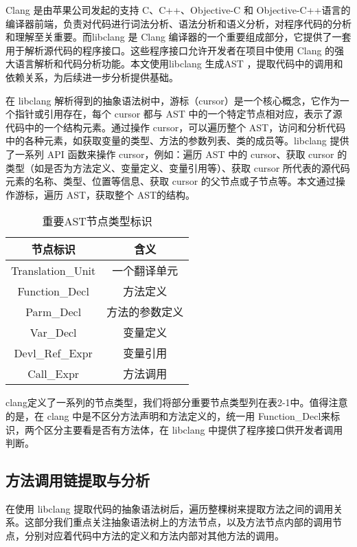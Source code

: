 Clang 是由苹果公司发起的支持 C、C++、Objective-C 和 Objective-C++语言的编译器前端，负责对代码进行词法分析、语法分析和语义分析，对程序代码的分析和理解至关重要\cite{clang}。而libclang 是 Clang 编译器的一个重要组成部分，它提供了一套用于解析源代码的程序接口。这些程序接口允许开发者在项目中使用 Clang 的强大语言解析和代码分析功能\cite{libclang}。本文使用libclang 生成AST ，提取代码中的调用和依赖关系，为后续进一步分析提供基础。

在 libclang 解析得到的抽象语法树中，游标（cursor）是一个核心概念，它作为一个指针或引用存在，每个 cursor 都与 AST 中的一个特定节点相对应，表示了源代码中的一个结构元素。通过操作 cursor，可以遍历整个 AST，访问和分析代码中的各种元素，如获取变量的类型、方法的参数列表、类的成员等。libclang 提供了一系列 API 函数来操作 cursor，例如：遍历 AST 中的 cursor、获取 cursor 的类型（如是否为方法定义、变量定义、变量引用等）、获取 cursor 所代表的源代码元素的名称、类型、位置等信息、获取 cursor 的父节点或子节点等。本文通过操作游标，遍历 AST，获取整个 AST的结构。

\begin{table}[htbp]
\caption{重要AST节点类型标识}
\vspace{0.5em}\centering\wuhao
\begin{tabular}{cc}
\toprule
节点标识 & 含义  \\
\midrule
Translation\_Unit & 一个翻译单元 \\
Function\_Decl  & 方法定义 \\
Parm\_Decl & 方法的参数定义 \\
Var\_Decl & 变量定义 \\ 
Devl\_Ref\_Expr  & 变量引用  \\
Call\_Expr  & 方法调用  \\
\bottomrule
\end{tabular}
\end{table}   

clang定义了一系列的节点类型，我们将部分重要节点类型列在表2-1中。值得注意的是，在 clang 中是不区分方法声明和方法定义的，统一用 Function\_Decl来标识，两个区分主要看是否有方法体，在 libclang 中提供了程序接口供开发者调用判断。

\subsection{方法调用链提取与分析}
在使用 libclang 提取代码的抽象语法树后，遍历整棵树来提取方法之间的调用关系。这部分我们重点关注抽象语法树上的方法节点，以及方法节点内部的调用节点，分别对应着代码中方法的定义和方法内部对其他方法的调用。


